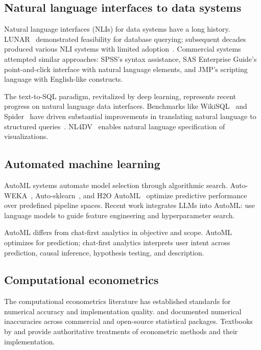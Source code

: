 \subsection{Natural language interfaces to data systems}

Natural language interfaces (NLIs) for data systems have a long history.
LUNAR~\citep{Woods:1973} demonstrated feasibility for database querying;
subsequent decades produced various NLI systems with limited
adoption~\citep{Androutsopoulos+etal:1995}. Commercial systems attempted similar
approaches: SPSS's syntax assistance, SAS Enterprise Guide's point-and-click
interface with natural language elements, and JMP's scripting language with
English-like constructs.

The text-to-SQL paradigm, revitalized by deep learning, represents recent
progress on natural language data interfaces. Benchmarks like
WikiSQL~\citep{Zhong+etal:2017} and Spider~\citep{Yu+etal:2018} have driven substantial
improvements in translating natural language to structured
queries~\citep{Li+etal:2024}. NL4DV~\citep{Narechania+etal:2021} enables
natural language specification of visualizations.

\subsection{Automated machine learning}

AutoML systems automate model selection through algorithmic search.
Auto-WEKA~\citep{Thornton+etal:2013}, Auto-sklearn~\citep{Feurer+etal:2015},
and H2O AutoML~\citep{LeDell+Poirier:2020} optimize predictive performance
over predefined pipeline spaces. Recent work integrates LLMs into AutoML:
\cite{Hollmann+etal:2024} use language models to guide feature engineering
and hyperparameter search.

AutoML differs from chat-first analytics in objective and scope. AutoML
optimizes for prediction; chat-first analytics interprets user intent across
prediction, causal inference, hypothesis testing, and description.

\subsection{Computational econometrics}

The computational econometrics literature has established standards for
numerical accuracy and implementation quality. \cite{McCullough:1997} and
\cite{McCullough+Vinod:1999} documented numerical inaccuracies across
commercial and open-source statistical packages. Textbooks by
\cite{Davidson+MacKinnon:2004} and \cite{Cameron+Trivedi:2005}
provide authoritative treatments of econometric methods and their
implementation.


